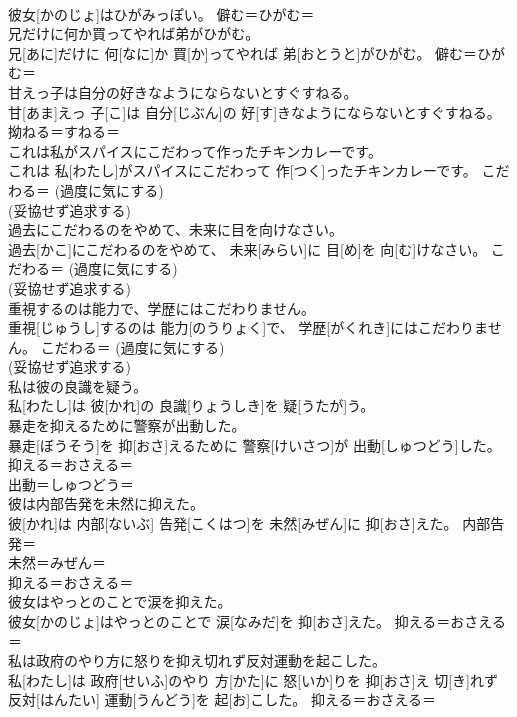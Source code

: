 \documentclass[8pt]{extreport}
\begin{document}
\begin{CJK}{UTF8}{min}
{\\	彼女[かのじょ]はひがみっぽい。	僻む＝ひがむ＝ 
\\	兄だけに何か買ってやれば弟がひがむ。	
\\	兄[あに]だけに 何[なに]か 買[か]ってやれば 弟[おとうと]がひがむ。	僻む＝ひがむ＝ 
\\	甘えっ子は自分の好きなようにならないとすぐすねる。	
\\	甘[あま]えっ 子[こ]は 自分[じぶん]の 好[す]きなようにならないとすぐすねる。	拗ねる＝すねる＝ 
\\	これは私がスパイスにこだわって作ったチキンカレーです。	
\\	これは 私[わたし]がスパイスにこだわって 作[つく]ったチキンカレーです。	こだわる＝ (過度に気にする) 
\\	(妥協せず追求する) 
\\	過去にこだわるのをやめて、未来に目を向けなさい。	
\\	過去[かこ]にこだわるのをやめて、 未来[みらい]に 目[め]を 向[む]けなさい。	こだわる＝ (過度に気にする) 
\\	(妥協せず追求する) 
\\	重視するのは能力で、学歴にはこだわりません。	
\\	重視[じゅうし]するのは 能力[のうりょく]で、 学歴[がくれき]にはこだわりません。	こだわる＝ (過度に気にする) 
\\	(妥協せず追求する) 
\\	私は彼の良識を疑う。	
\\	私[わたし]は 彼[かれ]の 良識[りょうしき]を 疑[うたが]う。	
\\	暴走を抑えるために警察が出動した。	
\\	暴走[ぼうそう]を 抑[おさ]えるために 警察[けいさつ]が 出動[しゅつどう]した。	抑える＝おさえる＝ 
\\	出動＝しゅつどう＝ 
\\	彼は内部告発を未然に抑えた。	
\\	彼[かれ]は 内部[ないぶ] 告発[こくはつ]を 未然[みぜん]に 抑[おさ]えた。	内部告発＝ 
\\	未然＝みぜん＝ 
\\	抑える＝おさえる＝ 
\\	彼女はやっとのことで涙を抑えた。	
\\	彼女[かのじょ]はやっとのことで 涙[なみだ]を 抑[おさ]えた。	抑える＝おさえる＝ 
\\	私は政府のやり方に怒りを抑え切れず反対運動を起こした。	
\\	私[わたし]は 政府[せいふ]のやり 方[かた]に 怒[いか]りを 抑[おさ]え 切[き]れず 反対[はんたい] 運動[うんどう]を 起[お]こした。	抑える＝おさえる＝ 
}
\end{CJK}
\end{document}
